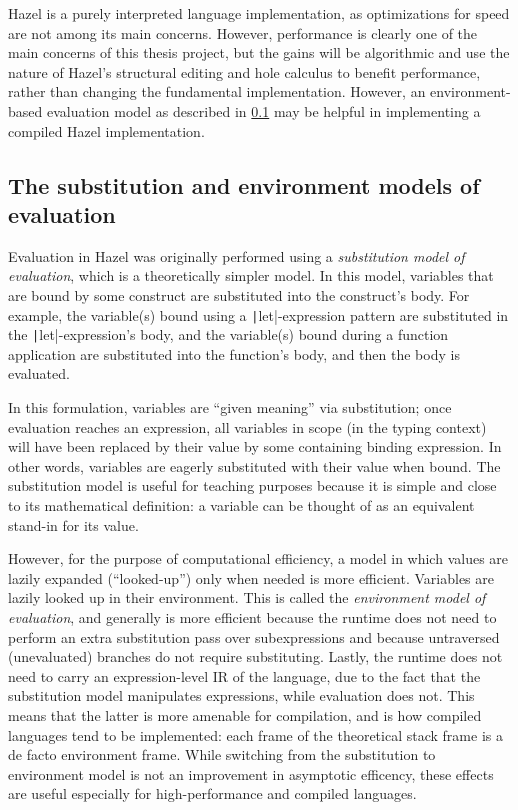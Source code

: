 Hazel is a purely interpreted language implementation, as optimizations for speed are not among its main concerns. However, performance is clearly one of the main concerns of this thesis project, but the gains will be algorithmic and use the nature of Hazel's structural editing and hole calculus to benefit performance, rather than changing the fundamental implementation. However, an environment-based evaluation model as described in \cref{sec:sub-vs-eval} may be helpful in implementing a compiled Hazel implementation.

\subsection{The substitution and environment models of evaluation}
\label{sec:sub-vs-eval}

Evaluation in Hazel was originally performed using a \textit{substitution model of evaluation}, which is a theoretically simpler model. In this model, variables that are bound by some construct are substituted into the construct's body. For example, the variable(s) bound using a \texttt|let|-expression pattern are substituted in the \texttt|let|-expression's body, and the variable(s) bound during a function application are substituted into the function's body, and then the body is evaluated.

In this formulation, variables are ``given meaning'' via substitution; once evaluation reaches an expression, all variables in scope (in the typing context) will have been replaced by their value by some containing binding expression. In other words, variables are eagerly substituted with their value when bound. The substitution model is useful for teaching purposes because it is simple and close to its mathematical definition: a variable can be thought of as an equivalent stand-in for its value.

However, for the purpose of computational efficiency, a model in which values are lazily expanded (``looked-up'') only when needed is more efficient. Variables are lazily looked up in their environment. This is called the \textit{environment model of evaluation}, and generally is more efficient because the runtime does not need to perform an extra substitution pass over subexpressions and because untraversed (unevaluated) branches do not require substituting. Lastly, the runtime does not need to carry an expression-level IR of the language, due to the fact that the substitution model manipulates expressions, while evaluation does not. This means that the latter is more amenable for compilation, and is how compiled languages tend to be implemented: each frame of the theoretical stack frame is a de facto environment frame. While switching from the substitution to environment model is not an improvement in asymptotic efficency, these effects are useful especially for high-performance and compiled languages.

